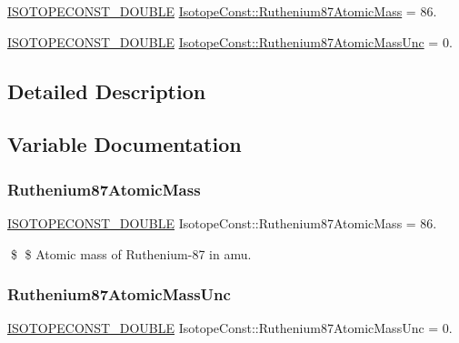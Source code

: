 \begin{DoxyCompactItemize}
\item 
\mbox{\hyperlink{group___isotope_const-_macros_ga8f45a7272ce02c0b4c65c44636ed719a}{I\+S\+O\+T\+O\+P\+E\+C\+O\+N\+S\+T\+\_\+\+D\+O\+U\+B\+LE}} \mbox{\hyperlink{group___isotope_const-_ruthenium-_ru87_ga373bdafa8b8599b0b903198b35933bcd}{Isotope\+Const\+::\+Ruthenium87\+Atomic\+Mass}} = 86.
\item 
\mbox{\hyperlink{group___isotope_const-_macros_ga8f45a7272ce02c0b4c65c44636ed719a}{I\+S\+O\+T\+O\+P\+E\+C\+O\+N\+S\+T\+\_\+\+D\+O\+U\+B\+LE}} \mbox{\hyperlink{group___isotope_const-_ruthenium-_ru87_ga08ffaef55b27cbb5e0150ded9caa9df4}{Isotope\+Const\+::\+Ruthenium87\+Atomic\+Mass\+Unc}} = 0.
\end{DoxyCompactItemize}


\subsection{Detailed Description}


\subsection{Variable Documentation}
\mbox{\label{group___isotope_const-_ruthenium-_ru87_ga373bdafa8b8599b0b903198b35933bcd}} 
\subsubsection{\texorpdfstring{Ruthenium87\+Atomic\+Mass}{Ruthenium87AtomicMass}}
{\footnotesize\ttfamily \mbox{\hyperlink{group___isotope_const-_macros_ga8f45a7272ce02c0b4c65c44636ed719a}{I\+S\+O\+T\+O\+P\+E\+C\+O\+N\+S\+T\+\_\+\+D\+O\+U\+B\+LE}} Isotope\+Const\+::\+Ruthenium87\+Atomic\+Mass = 86.}

\$ \$ Atomic mass of Ruthenium-\/87 in amu. \mbox{\label{group___isotope_const-_ruthenium-_ru87_ga08ffaef55b27cbb5e0150ded9caa9df4}} 
\subsubsection{\texorpdfstring{Ruthenium87\+Atomic\+Mass\+Unc}{Ruthenium87AtomicMassUnc}}
{\footnotesize\ttfamily \mbox{\hyperlink{group___isotope_const-_macros_ga8f45a7272ce02c0b4c65c44636ed719a}{I\+S\+O\+T\+O\+P\+E\+C\+O\+N\+S\+T\+\_\+\+D\+O\+U\+B\+LE}} Isotope\+Const\+::\+Ruthenium87\+Atomic\+Mass\+Unc = 0.}

